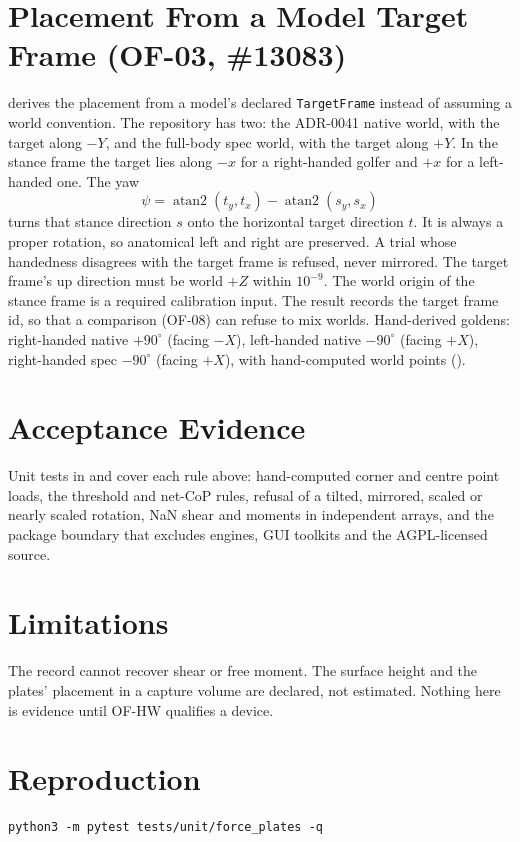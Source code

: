 \documentclass[11pt]{article}
\begin{document}
\section{Placement From a Model Target Frame (OF-03, \#13083)}

 derives the placement from a model's declared
\texttt{TargetFrame} instead of assuming a world convention. The repository
has two: the ADR-0041 native world, with the target along $-Y$, and the
full-body spec world, with the target along $+Y$. In the stance frame the
target lies along $-x$ for a right-handed golfer and $+x$ for a left-handed
one. The yaw
\begin{equation}
  \psi = \operatorname{atan2}(t_y, t_x) - \operatorname{atan2}(s_y, s_x)
\end{equation}
turns that stance direction $s$ onto the horizontal target direction $t$. It
is always a proper rotation, so anatomical left and right are preserved. A
trial whose handedness disagrees with the target frame is refused, never
mirrored. The target frame's up direction must be world $+Z$ within
$10^{-9}$. The world origin of the stance frame is a required calibration
input. The result records the target frame id, so that a comparison
(OF-08) can refuse to mix worlds. Hand-derived goldens: right-handed native
$+90^\circ$ (facing $-X$), left-handed native $-90^\circ$ (facing $+X$),
right-handed spec $-90^\circ$ (facing $+X$), with hand-computed world points
().

\section{Acceptance Evidence}

Unit tests in  and
 cover each rule above: hand-computed
corner and centre point loads, the threshold and net-CoP rules, refusal of a
tilted, mirrored, scaled or nearly scaled rotation, NaN shear and moments in
independent arrays, and the package boundary that excludes engines, GUI
toolkits and the AGPL-licensed source.

\section{Limitations}

The record cannot recover shear or free moment. The surface height and the
plates' placement in a capture volume are declared, not estimated. Nothing
here is evidence until OF-HW qualifies a device.

\section{Reproduction}

\begin{verbatim}
python3 -m pytest tests/unit/force_plates -q
\end{verbatim}
\end{document}
